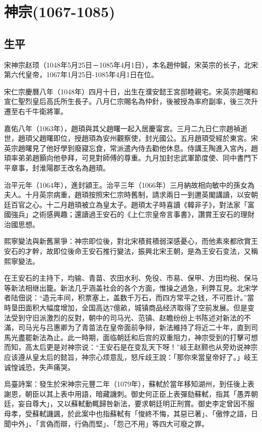 
\section{神宗\tiny(1067-1085)}

\subsection{生平}

宋神宗赵顼（1048年5月25日－1085年4月1日），本名趙仲鍼，宋英宗的长子，北宋第六代皇帝，1067年1月25日-1085年4月1日在位。

宋仁宗慶曆八年（1048年）四月十日，出生在濮安懿王宮邸睦親宅。宋英宗趙曙和宣仁聖烈皇后高氏所生長子。八月仁宗賜名為仲針，後被授為率府副率，後三次升遷至右千牛衛將軍。

嘉佑八年（1063年），趙頊與其父趙曙一起入居慶甯宮。三月二九日仁宗趙禎逝世，趙頊父趙曙即位，授趙頊為安州觀察使，封光國公。五月趙頊受經於東宮。宋英宗趙曙見了他好學到廢寢忘食，常派遣內侍去勸他休息。侍講王陶進入宮內，趙頊率弟弟趙顥向他參拜，可見對師傅的尊重。九月加封忠武軍節度使、同中書門下平章事，封淮陽郡王改名為趙頊。

治平元年（1064年），進封潁王。治平三年（1066年）三月納故相向敏中的孫女為夫人。十月英宗病重，趙頊按照宋仁宗時舊制，請求兩日一到邇英閣講讀，以安朝廷百官之心。十二月趙頊被立為皇太子。趙頊太子時喜讀《韓非子》，對法家「富國強兵」之術感興趣；還讀過王安石的《上仁宗皇帝言事書》，讚賞王安石的理財治國思想。

熙寧變法與新舊黨爭：神宗即位後，對北宋積貧積弱深感憂心，而他素來都欣賞王安石的才幹，故即位後命王安石推行變法，振興北宋王朝，是為王安石变法，又稱熙寧變法。

在王安石的主持下，均输、青苗、农田水利、免役、市易、保甲、方田均税、保马等新法相继出籠。新法几乎涵盖社会的各个方面，惟操之過急，利弊互見。北宋学者陆佃说：“造元丰间，积票塞上，盖数千万石，而四方常平之钱，不可胜计。”當時垦田面积大幅度增加，全国高达7億畝，城镇商品经济取得了空前发展。但是变法受到守旧派激烈的反對，朝中的司马光、范镇、赵瞻纷纷上书陈述对新法的不滿，司马光与吕惠卿为了青苗法在皇帝面前争辩，新法維持了将近二十年，直到司馬光盡罷新法為止。此一時期，面临朝廷和后宫的双重阻力，神宗受到的打擊可想而知，高太后更是对神宗说：“王安石是在变乱天下呀！”岐王赵颢也从旁劝说神宗应该遵从皇太后的懿旨，神宗心烦意乱，怒斥歧王說：「那你來當皇帝好了。」岐王诚惶诚恐，失声痛哭。

烏臺詩案：發生於宋神宗元豐二年（1079年），蘇軾於當年移知湖州，到任後上表謝恩，朝臣以其上表中用語，暗藏譏刺。御史何正臣上表彈劾蘇軾，指其「愚弄朝廷，妄自尊大」，又以蘇軾動輒歸咎新法，要求朝廷明正刑賞。御史李定曾因不服母孝，受蘇軾譏諷，於此案中也指蘇軾有「悛終不悔，其惡已著」、「傲悖之語，日聞中外」、「言偽而辯，行偽而堅」、「怨己不用」等四大可廢之罪。

